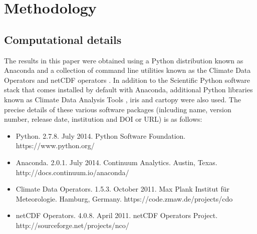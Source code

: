 \section{Methodology}\label{s:methodology}

\subsection{Computational details}\label{s:computational_details}

The results in this paper were obtained using a Python distribution known as Anaconda and a collection of command line utilities known as the Climate Data Operators \citep[CDO;][]{Schulzweida2014} and netCDF operators \citep[NCO;][]{Zender2014}. In addition to the Scientific Python \citep[SciPy;][]{SciPy} software stack that comes installed by default with Anaconda, additional Python libraries known as Climate Data Analysis Tools \citep[CDAT;][]{Doutriaux2009}, iris \citep{Iris} and cartopy \citep{Cartopy} were also used. The precise details of these various software packages (inlcuding name, version number, release date, institution and DOI or URL) is as follows:
\begin{itemize}
\item Python. 2.7.8. July 2014. Python Software Foundation. https://www.python.org/
\item Anaconda. 2.0.1. July 2014. Continuum Analytics. Austin, Texas. http://docs.continuum.io/anaconda/
\item Climate Data Operators. 1.5.3. October 2011. Max Plank Institut f{\"u}r Meteorologie. Hamburg, Germany. https://code.zmaw.de/projects/cdo
\item netCDF Operators. 4.0.8. April 2011. netCDF Operators Project. http://sourceforge.net/projects/nco/


\end{itemize}


